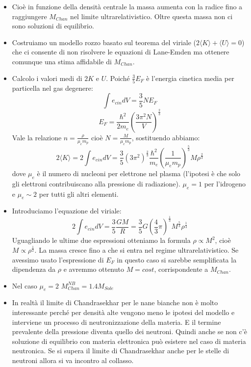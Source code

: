 \documentclass[11pt,a4paper]{article}
\begin{document}
\begin{itemize}
\item Cioè in funzione della densità centrale la massa aumenta con la radice fino a raggiungere $M_{Chan}$ nel limite ultrarelativistico. Oltre questa massa non ci sono soluzioni di equilibrio.

\item Costruiamo un modello rozzo basato sul teorema del viriale ($2 \langle K \rangle + \langle U \rangle = 0$) che ci consente di non risolvere le equazioni di Lane-Emden ma ottenere comunque una stima affidabile di $M_{Chan}$.

\item Calcolo i valori medi di $2K$ e $U$. Poiché $\frac{3}{5} E_F$ è l'energia cinetica media per particella nel gas degenere:
\begin{equation}
\int e_{cin} dV = \frac{3}{5} N E_F
\end{equation}
\begin{equation}
E_F = \frac{\hbar^2}{2 m_e} \left( \frac{3 \pi^2 N}{V} \right) ^ {\frac{2}{3}}
\end{equation}
Vale la relazione $n = \frac{\rho}{\mu_e m_p}$ cioè $N = \frac{M}{\mu_e m_p}$, sostituendo abbiamo:
\begin{equation}
2 \langle K \rangle = 2 \int e_{cin} dV = \frac{3}{5} (3 \pi^2)^{\frac{2}{3}} \frac{\hbar^2}{m_e} \left( \frac{1}{\mu_e m_p} \right) ^{\frac{5}{3}} M \rho^{\frac{2}{3}}
\end{equation}
dove $\mu_e$ è il numero di nucleoni per elettrone nel plasma (l'ipotesi è che solo gli elettroni contribuiscano alla pressione di radiazione). $\mu_e = 1$ per l'idrogeno e $\mu_e \sim 2$ per tutti gli altri elementi. 

\item Introduciamo l'equazione del viriale: 
\begin{equation}
2 \int e_{cin} dV = \frac{3}{5} \frac{GM}{R} = \frac{3}{5} G \left( \frac{4}{3} \pi \right)^{\frac{1}{3}} M^{\frac{5}{3}} \rho^{\frac{1}{3}}
\end{equation}
Uguagliando le ultime due espressioni otteniamo la formula $\rho \propto M^2$, cioè $M \propto \rho^{\frac{1}{2}}$. La massa cresce fino a che si entra nel regime ultrarelativistico. Se avessimo usato l'espressione di $E_F$ in questo caso si sarebbe semplificata la dipendenza da $\rho$ e avremmo ottenuto $M = cost$, corrispondente a $M_{Chan}$.

\item Nel caso $\mu_e = 2$ $M_{Chan}^{NB} = 1.4 M_{Sole}$

\item In realtà il limite di Chandrasekhar per le nane bianche non è molto interessante perché per densità alte vengono meno le ipotesi del modello e interviene un processo di neutronizzazione della materia. E il termine prevalente della pressione diventa quello dei neutroni.
Quindi anche se non c'è soluzione di equilibrio con materia elettronica può esistere nel caso di materia neutronica. Se si supera il limite di Chandrasekhar anche per le stelle di neutroni allora si va incontro al collasso.


\end{itemize}
\end{document}
